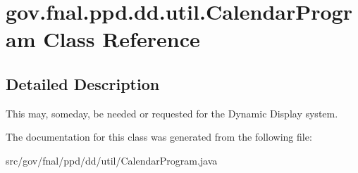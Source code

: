 \hypertarget{classgov_1_1fnal_1_1ppd_1_1dd_1_1util_1_1CalendarProgram}{\section{gov.\-fnal.\-ppd.\-dd.\-util.\-Calendar\-Program Class Reference}
\label{classgov_1_1fnal_1_1ppd_1_1dd_1_1util_1_1CalendarProgram}
}


\subsection{Detailed Description}
This may, someday, be needed or requested for the Dynamic Display system. 

The documentation for this class was generated from the following file\-:\begin{DoxyCompactItemize}
\item 
src/gov/fnal/ppd/dd/util/Calendar\-Program.\-java\end{DoxyCompactItemize}

